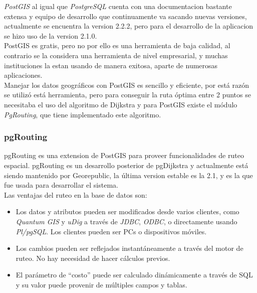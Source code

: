       \emph{PostGIS} al igual que \emph{PostgreSQL} cuenta con una documentacion bastante extensa y equipo de desarrollo que continuamente va sacando nuevas versiones, actualmente se encuentra la version 2.2.2, pero para el desarrollo de la aplicacion se hizo uso de la version 2.1.0.\\

      PostGIS es gratis, pero no por ello es una herramienta de baja calidad, al contrario se la considera una herramienta de nivel empresarial, y muchas instituciones la estan usando de manera exitosa, aparte de numerosas aplicaciones.\\

      Manejar los datos geográficos con PostGIS es sencillo y eficiente, por está raz\'on se utilizó está herramienta, pero para conseguir la ruta óptima entre 2 puntos se necesitaba el uso del algoritmo de Dijkstra y para PostGIS existe el módulo \emph{PgRouting}, que tiene implementado este algoritmo.\\

      \subsubsection{pgRouting} %
      \label{sec:pgrouting}
        pgRouting es una extension  de  PostGIS para proveer funcionalidades de ruteo espacial. pgRouting es un desarrollo posterior de pgDijkstra y actualmente está siendo mantenido por Georepublic, la última version estable es la 2.1, y es la que fue usada para desarrollar el sistema.\\

        Las ventajas del ruteo en la base de datos son:
        \begin{itemize}
          \item Los datos y atributos pueden ser modificados desde varios clientes, como \emph{Quantum GIS} y \emph{uDig} a través de \emph{JDBC}, \emph{ODBC}, o directamente usando \emph{Pl/pgSQL}. Los clientes pueden ser PCs o dispositivos móviles.
          \item Los cambios pueden ser reflejados instantáneamente a través del motor de ruteo. No hay necesidad de hacer cálculos previos.
          \item El parámetro de ``costo'' puede ser calculado dinámicamente a través de SQL y su valor puede provenir de múltiples campos y tablas.
        \end{itemize}

